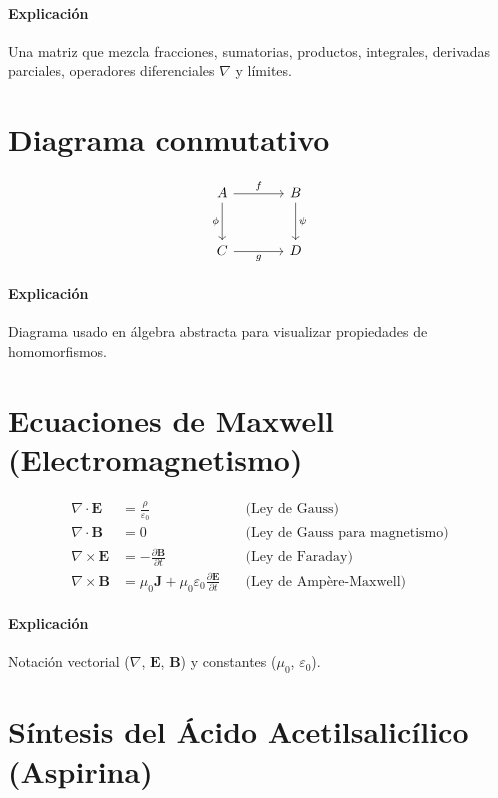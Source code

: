 \paragraph*{Explicación} Una matriz que mezcla fracciones, sumatorias, productos, integrales, derivadas parciales, operadores diferenciales $\nabla$ y límites.

\section{Diagrama conmutativo}

\[
\begin{tikzcd}[row sep=large, column sep=large]
	A \arrow[r, "f"] \arrow[d, "\phi"'] & B \arrow[d, "\psi"] \\
	C \arrow[r, "g"'] & D
\end{tikzcd}
\]

\paragraph*{Explicación} Diagrama usado en álgebra abstracta para visualizar propiedades de homomorfismos.

\section{Ecuaciones de Maxwell (Electromagnetismo)}

\[
\begin{aligned}
	\nabla \cdot \mathbf{E} &= \frac{\rho}{\varepsilon_0} \quad &\text{(Ley de Gauss)} \\
	\nabla \cdot \mathbf{B} &= 0 \quad &\text{(Ley de Gauss para magnetismo)} \\
	\nabla \times \mathbf{E} &= -\frac{\partial \mathbf{B}}{\partial t} \quad &\text{(Ley de Faraday)} \\
	\nabla \times \mathbf{B} &= \mu_0 \mathbf{J} + \mu_0 \varepsilon_0 \frac{\partial \mathbf{E}}{\partial t} \quad &\text{(Ley de Ampère-Maxwell)}
\end{aligned}
\]

\paragraph*{Explicación} Notación vectorial (\(\nabla\), \(\mathbf{E}\), \(\mathbf{B}\)) y constantes (\(\mu_0\), \(\varepsilon_0\)).

\section{Síntesis del Ácido Acetilsalicílico (Aspirina)}

